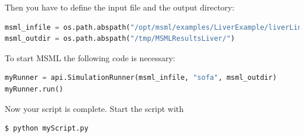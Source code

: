 Then you have to define the input file and the output directory:
\begin{lstlisting}[language=Python]
msml_infile = os.path.abspath("/opt/msml/examples/LiverExample/liverLinear.msml.xml")
msml_outdir = os.path.abspath("/tmp/MSMLResultsLiver/")
\end{lstlisting}

To start MSML the following code is necessary:
\begin{lstlisting}[language=Python]
myRunner = api.SimulationRunner(msml_infile, "sofa", msml_outdir)
myRunner.run()
\end{lstlisting}

Now your script is complete. Start the script with
\begin{lstlisting}[language=sh, breaklines=true]
$ python myScript.py
\end{lstlisting}
 
